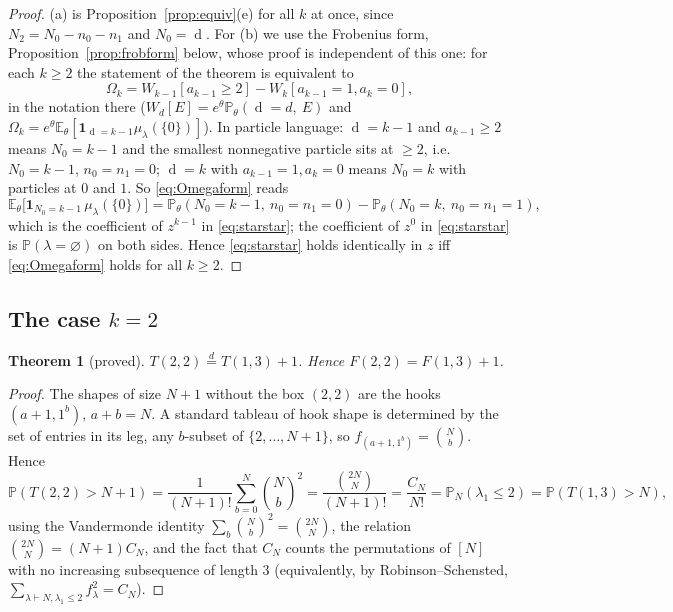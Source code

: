 \documentclass[11pt]{article}
\newtheorem{theorem}{Theorem}[section]
\theoremstyle{definition}
\theoremstyle{remark}
\newcommand{\E}{\mathbb{E}}
\newcommand{\Prob}{\mathbb{P}}
\DeclareMathOperator{\Durfee}{d}
\begin{document}
\begin{proof}
(a) is Proposition~\ref{prop:equiv}(e) for all $k$ at once, since $N_2=N_0-n_0-n_1$ and $N_0=\Durfee$. For (b) we use the Frobenius form, Proposition~\ref{prop:frobform} below, whose proof is independent of this one: for each $k\ge2$ the statement of the theorem is equivalent to
\begin{equation}\label{eq:Omegaform}
\Omega_k=W_{k-1}[a_{k-1}\ge2]-W_k[a_{k-1}=1,a_k=0],
\end{equation}
in the notation there ($W_d[E]=e^\theta\Prob_\theta(\Durfee=d,\ E)$ and $\Omega_k=e^\theta\E_\theta[\mathbf 1_{\Durfee=k-1}\mu_\lambda(\{0\})]$). In particle language: $\Durfee=k-1$ and $a_{k-1}\ge2$ means $N_0=k-1$ and the smallest nonnegative particle sits at $\ge2$, i.e.\ $N_0=k-1$, $n_0=n_1=0$; $\Durfee=k$ with $a_{k-1}=1,a_k=0$ means $N_0=k$ with particles at $0$ and $1$. So \eqref{eq:Omegaform} reads
\[
\E_\theta\bigl[\mathbf 1_{N_0=k-1}\,\mu_\lambda(\{0\})\bigr]=\Prob_\theta(N_0=k-1,\ n_0=n_1=0)-\Prob_\theta(N_0=k,\ n_0=n_1=1),
\]
which is the coefficient of $z^{k-1}$ in \eqref{eq:starstar}; the coefficient of $z^0$ in \eqref{eq:starstar} is $\Prob(\lambda=\varnothing)$ on both sides. Hence \eqref{eq:starstar} holds identically in $z$ iff \eqref{eq:Omegaform} holds for all $k\ge2$.
\end{proof}

\subsection{The case $k=2$}

\begin{theorem}[proved]\label{thm:k2}
$T(2,2)\overset{d}{=}T(1,3)+1$. Hence $F(2,2)=F(1,3)+1$.
\end{theorem}

\begin{proof}
The shapes of size $N+1$ without the box $(2,2)$ are the hooks $(a+1,1^b)$, $a+b=N$. A standard tableau of hook shape is determined by the set of entries in its leg, any $b$-subset of $\{2,\dots,N+1\}$, so $f_{(a+1,1^b)}=\binom Nb$. Hence
\[
\Prob(T(2,2)>N+1)=\frac1{(N+1)!}\sum_{b=0}^N\binom Nb^2=\frac{\binom{2N}N}{(N+1)!}=\frac{C_N}{N!}=\Prob_N(\lambda_1\le2)=\Prob(T(1,3)>N),
\]
using the Vandermonde identity $\sum_b\binom Nb^2=\binom{2N}N$, the relation $\binom{2N}N=(N+1)C_N$, and the fact that $C_N$ counts the permutations of $[N]$ with no increasing subsequence of length $3$ (equivalently, by Robinson--Schensted, $\sum_{\lambda\vdash N,\lambda_1\le2}f_\lambda^2=C_N$).
\end{proof}
\end{document}
